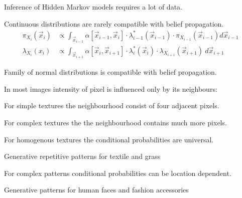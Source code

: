 \documentclass[landscape,footrule]{foils}
\begin{document}
\titlefoil




\begin{triangles}
\item Inference of Hidden Markov models requires a lot of data.
\item Continuous distributions are rarely compatible with belief propagation.
\begin{align*}
\pi_{X_i}(\vec{x}_i)
&\propto \int_{\vec{x}_{i-1}} \alpha[\vec{x}_{i-1}, \vec{x}_i]\cdot\lambda_{i-1}^*(\vec{x}_{i-1})\cdot \pi_{X_{i-1}}(\vec{x}_{i-1})d\vec{x}_{i-1}\\
\lambda_{X_i}(x_i)
&\propto \int_{\vec{x}_{i+1}} \alpha[\vec{x}_{i}, \vec{x}_{i+1}]\cdot\lambda_{i}^*(\vec{x}_{i})\cdot\lambda_{X_{i+1}}(\vec{x}_{i+1})\ d\vec{x}_{i+1}
\end{align*}
\item Family of normal distributions is compatible with belief propagation.
 
\end{triangles}



In most images intensity of pixel is influenced only by its neighbours:
\begin{triangles}
\item For simple textures the neighbourhood consist of four adjacent pixels.
\item For complex textures the the neighbourhood contains much more pixels.
\item For homogenous textures the conditional probabilities are universal\vspace*{0.5ex}.
\begin{diamonds}
\item Generative repetitive patterns for textile and grass\vspace*{1ex}   
\end{diamonds}

\item For complex patterns conditional probabilities can be location dependent.\vspace*{0.5ex}

\begin{diamonds}
\item Generative patterns for human faces and fashion accessories 
\end{diamonds}
\end{triangles}
\end{document}
